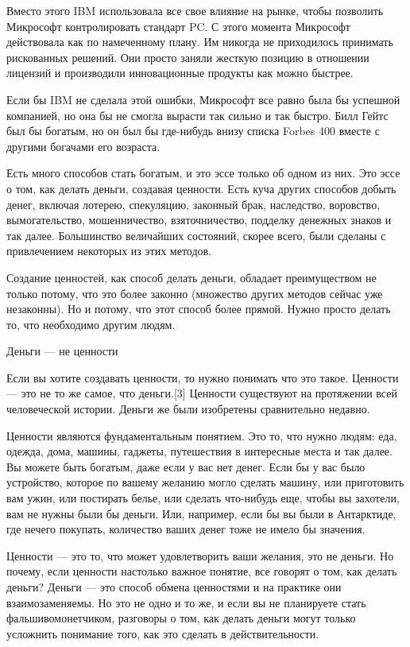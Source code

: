 \documentclass[ebook,12pt,oneside,openany]{memoir}
\begin{document}
Вместо этого IBM использовала все свое влияние на рынке, чтобы
позволить Микрософт контролировать стандарт PC. С этого момента
Микрософт действовала как по намеченному плану. Им никогда не
приходилось принимать рискованных решений. Они просто заняли жесткую
позицию в отношении лицензий и производили инновационные продукты как
можно быстрее.

Если бы IBM не сделала этой ошибки, Микрософт все равно была бы
успешной компанией, но она бы не смогла вырасти так сильно и так
быстро. Билл Гейтс был бы богатым, но он был бы где-нибудь внизу
списка Forbes 400 вместе с другими богачами его возраста.

Есть много способов стать богатым, и это эссе только об одном из них.
Это эссе о том, как делать деньги, создавая ценности. Есть куча других
способов добыть денег, включая лотерею, спекуляцию, законный брак,
наследство, воровство, вымогательство, мошенничество, взяточничество,
подделку денежных знаков и так далее. Большинство величайших
состояний, скорее всего, были сделаны с привлечением некоторых из этих
методов.

Создание ценностей, как способ делать деньги, обладает преимуществом
не только потому, что это более законно (множество других методов
сейчас уже незаконны). Но и потому, что этот способ более прямой.
Нужно просто делать то, что необходимо другим людям.

Деньги — не ценности

Если вы хотите создавать ценности, то нужно понимать что это такое.
Ценности — это не то же самое, что деньги.[3] Ценности существуют на
протяжении всей человеческой истории. Деньги же были изобретены
сравнительно недавно.

Ценности являются фундаментальным понятием. Это то, что нужно людям:
еда, одежда, дома, машины, гаджеты, путешествия в интересные места и
так далее. Вы можете быть богатым, даже если у вас нет денег. Если бы
у вас было устройство, которое по вашему желанию могло сделать машину,
или приготовить вам ужин, или постирать белье, или сделать что-нибудь
еще, чтобы вы захотели, вам не нужны были бы деньги. Или, например,
если бы вы были в Антарктиде, где нечего покупать, количество ваших
денег тоже не имело бы значения.

Ценности — это то, что может удовлетворить ваши желания, это не
деньги. Но почему, если ценности настолько важное понятие, все говорят
о том, как делать деньги? Деньги — это способ обмена ценностями и на
практике они взаимозаменяемы. Но это не одно и то же, и если вы не
планируете стать фальшивомонетчиком, разговоры о том, как делать
деньги могут только усложнить понимание того, как это сделать в
действительности.
\end{document}
